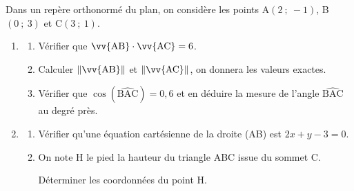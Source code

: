 \medskip

Dans un repère orthonormé \Oij{} du plan, on considère les points A$(2~;~-1)$,
B$(0~;~3)$ et C$(3~;~1)$.
\begin{enumerate}
\item \begin{enumerate}
		\item Vérifier que $\vv{\text{AB}}\cdot\vv{\text{AC}} = 6$.


		\item Calculer $\left\|\vv{\text{AB}}\right\|$ et $\left\|\vv{\text{AC}}\right\|$, on donnera les valeurs exactes.



		\item Vérifier que $\cos(\widehat{\text{BAC}}) = 0,6$ et en déduire la mesure de l'angle $\widehat{\text{BAC}}$ au degré près.







		\end{enumerate}
\item 
	\begin{enumerate}
		\item Vérifier qu'une équation cartésienne de la droite (AB) est $2x + y - 3 = 0$.

















		\item On note H le pied la hauteur du triangle ABC issue du sommet C.

Déterminer les coordonnées du point H.






















	\end{enumerate}
\end{enumerate}

\vspace{0,5cm}
